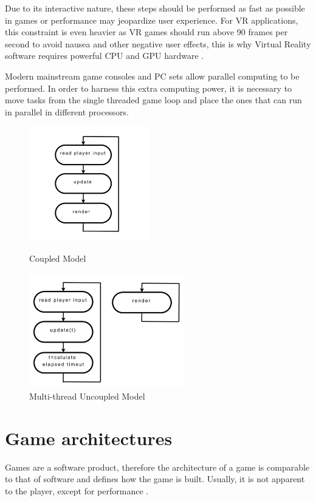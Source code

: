 \documentclass[runningheads]{llncs}
\begin{document}
Due to its interactive nature, these steps should be performed as fast as possible in games or performance may jeopardize user experience. For VR applications, this constraint is even heavier as VR games should run above 90 frames per second to avoid nausea and other negative user effects, this is why Virtual Reality software requires powerful CPU and GPU hardware \cite{gregory_2019}. 

Modern mainstream game consoles and PC sets allow parallel computing to be performed. In order to harness this extra computing power, it is necessary to move tasks from the single threaded game loop and place the ones that can run in parallel in different processors. 

\begin{figure}
    \centering
    \begin{minipage}{.5\textwidth}
        \centering
        \includegraphics[width=\linewidth,height=5cm]{src/hci2020-images/CoupledGameLoop.png}
        \caption{Coupled Model}
        \label{fig:coupledModel}
    \end{minipage}%
    \begin{minipage}{.5\textwidth}
        \centering
        \includegraphics[width=\linewidth,height=5cm]{src/hci2020-images/UncoupledGameLoop.png}
        \caption{Multi-thread Uncoupled Model}
        \label{fig:uncoupledModel}
    \end{minipage}
\end{figure}


\section{Game architectures}
Games are a  software product, therefore the  architecture of a game is comparable to that of software and defines how the game is built. Usually, it is not apparent to the player, except for performance \cite{croft_2004}.
\end{document}
